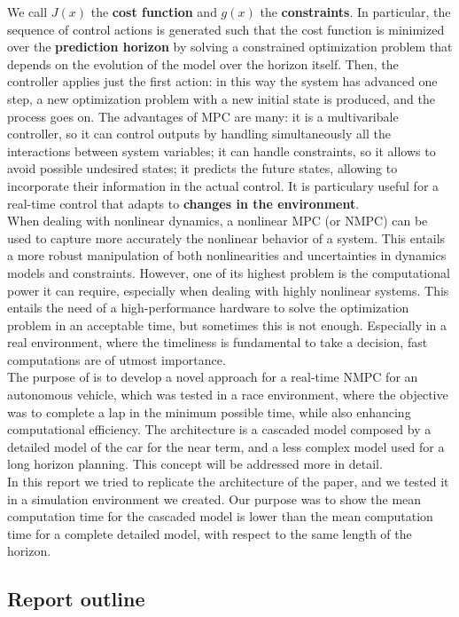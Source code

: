 \documentclass[a4paper, twocolumn, 11pt, twoside]{article}
\begin{document}
We call $J(x)$ the \textbf{cost function} and $g(x)$ the \textbf{constraints}.
In particular, the sequence of control actions is generated such that the cost
function is minimized over the \textbf{prediction horizon} by solving a
constrained optimization problem that depends on the evolution of the model over
the horizon itself. Then, the controller applies just the first action: in this
way the system has advanced one step, a new optimization problem with a new
initial state is produced, and the process goes on. The advantages of MPC are
many: it is a multivaribale controller, so it can control outputs by handling
simultaneously all the interactions between system variables; it can handle
constraints, so it allows to avoid possible undesired states; it predicts the
future states, allowing to incorporate their information in the actual control.
It is particulary useful for a real-time control that adapts to \textbf{changes
in the environment}.\\
When dealing with nonlinear dynamics, a nonlinear MPC (or NMPC) can be used to
capture more accurately the nonlinear behavior of a system. This entails a more
robust manipulation of both nonlinearities and uncertainties in dynamics models
and constraints. However, one of its highest problem is the computational power
it can require, especially when dealing with highly nonlinear systems. This
entails the need of a high-performance hardware to solve the optimization
problem in an acceptable time, but sometimes this is not enough. Especially in a
real environment, where the timeliness is fundamental to take a decision, fast
computations are of utmost importance.\\
The purpose of \cite{paper} is to develop a novel approach for a real-time NMPC
for an autonomous vehicle, which was tested in a race environment, where the
objective was to complete a lap in the minimum possible time, while also
enhancing computational efficiency. The architecture is a cascaded model
composed by a detailed model of the car for the near term, and a less complex
model used for a long horizon planning. This concept will be addressed more in
detail.\\
In this report we tried to replicate the architecture of the paper, and we
tested it in a simulation environment we created. Our purpose was to show the
mean computation time for the cascaded model is lower than the mean computation
time for a complete detailed model, with respect to the same length of the
horizon.

\subsection*{Report outline}
\end{document}

